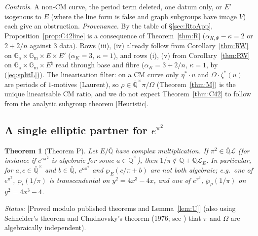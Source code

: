 \documentclass[11pt]{amsart}
\newtheorem{theorem}{Theorem}[section]
\theoremstyle{definition}
\newcommand{\Qb}{\overline{\mathbb{Q}}}
\newcommand{\Ga}{\mathbb{G}_{\mathrm a}}
\newcommand{\Gm}{\mathbb{G}_{\mathrm m}}
\newcommand{\Lg}{\mathcal{L}}
\newcommand{\lab}[1]{\textup{[#1]}}
\newcommand{\LabC}{\lab{Proved modulo published theorems and Lemma~\ref{lem:U}}}
\newcommand{\Status}{\noindent\emph{Status:} }
\begin{document}
\noindent\emph{Controls.} A non-CM curve, the period term deleted, one datum only, or $E'$ isogenous to $E$ (where the line form
is false and graph subgroups have image $V$) each give an obstruction. \emph{Provenance.} By the table of \S\ref{sec:RtoApp},
Proposition~\ref{prop:C42line} is a consequence of Theorem~\ref{thm:R} ($\alpha_{K,\Psi}-\kappa=2$ or $2+2/n$ against $3$ data).
Rows (iii), (iv) already follow from Corollary~\ref{thm:RW} on $\Ga\times\Gm\times E\times E'$ ($\alpha_K=3$, $\kappa=1$), and
rows (i), (v) from Corollary~\ref{thm:RW} on $\Ga\times\Gm\times E^\natural$ read through base and fibre ($\alpha_K=3+2/n$,
$\kappa=1$, by (\ref{eq:splitL})). The linearisation filter: on a CM curve only $\eta^*\cdot u$ and $\Omega\cdot\zeta^*(u)$ are
periods of $1$-motives (Laurent), so $\rho\in\Qb^\times\pi/\Omega$ (Theorem~\ref{thm:M}) is the unique linearisable CM ratio, and
we do not expect Theorem~\ref{thm:C42} to follow from the analytic subgroup theorem \lab{Heuristic}.

\subsection{A single elliptic partner for $e^{\pi^2}$}\label{sec:P}

\begin{theorem}[Theorem P]\label{thm:P}
Let $E/\Qb$ have complex multiplication. If $\pi^2\in\Qb\Lg$ (for instance if $e^{a\pi^2}$ is algebraic for some
$a\in\Qb^\times$), then $1/\pi\notin\Qb+\Qb\Lg_E$. In particular, for $a,c\in\Qb^\times$ and $b\in\Qb$, $e^{a\pi^2}$ and
$\wp_E(c/\pi+b)$ are not both algebraic; e.g.\ one of $e^{\pi^2}$, $\wp_i(1/\pi)$ is transcendental on $y^2=4x^3-4x$, and one of
$e^{\pi^2}$, $\wp_\rho(1/\pi)$ on $y^2=4x^3-4$.
\end{theorem}

\Status \LabC{} (also using Schneider's theorem \cite{Sch37} and Chudnovsky's theorem (1976; see \cite{Ch84}) that $\pi$
and $\Omega$ are algebraically independent).
\end{document}
